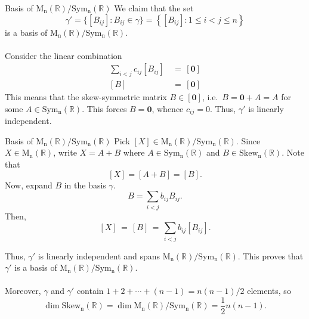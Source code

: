 \documentclass{beamer}
\def\dim{\operatorname{dim}}
\def\MnR{\operatorname{M_n(\mathbb{R})}}
\def\Sym{\operatorname{Sym_n(\mathbb{R})}}
\def\Skew{\operatorname{Skew_n(\mathbb{R})}}
\begin{document}
        \begin{frame}{Basis of $\MnR/\Sym$}
                We claim that the set 
                \[
                        \gamma' = \{[B_{ij}]\colon B_{ij} \in \gamma\} = \left\{[B_{ij}]\colon 1 \leq i < j \leq n\right\}
                \]
                is a basis of $\MnR/\Sym$. \\~\\
                \pause
                Consider the linear combination
                \begin{align*}
                        \sum_{i < j} c_{ij} [B_{ij}] \,&=\, [\mathbf{0}] \\
                        [B] \,&=\, [\mathbf{0}]
                \end{align*}
                This means that the skew-symmetric matrix $B \in [\mathbf{0}]$, i.e.\ $B = \mathbf{0} + A = A$ for some $A \in \Sym$.
                This forces $B = \mathbf{0}$, whence $c_{ij} = 0$. Thus, $\gamma'$ is linearly independent.
        \end{frame}

        \begin{frame}{Basis of $\MnR/\Sym$}
                Pick $[X] \in \MnR/\Sym$. Since $X \in \MnR$, write $X = A + B$ where $A \in \Sym$ and $B \in \Skew$. Note that
                \[
                        [X] = [A + B] = [B].
                \]
                \pause
                Now, expand $B$ in the basis $\gamma$.
                \[
                        B = \sum_{i < j} b_{ij} B_{ij}.
                \]
                Then,
                \[
                        [X] \,=\, [B] \,=\, \sum_{i < j} b_{ij} [B_{ij}].
                \]
        \end{frame}

        \begin{frame}
                Thus, $\gamma'$ is linearly independent and spans $\MnR/\Sym$. This proves that $\gamma'$ is a basis of $\MnR/\Sym$. \\~\\

                Moreover, $\gamma$ and $\gamma'$ contain $1 + 2 + \cdots + (n - 1) = n(n - 1)/2$ elements, so
                \[
                        \dim{\Skew} = \dim{\MnR/\Sym} = \frac{1}{2}n(n - 1).
                \]
        \end{frame}
\end{document}

